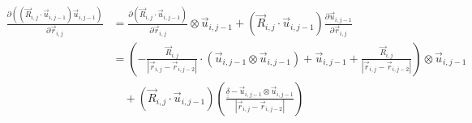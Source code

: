 \documentclass{article}
\renewcommand{\ij}{_{i,j}}
\newcommand{\ijj}{_{i,j-1}}
\newcommand{\ijk}{_{i,j-2}}
\newcommand{\ijjj}{_{i,j-2}}
\newcommand{\magn}[1]{\left\vert #1 \right\vert }
\renewcommand{\part}[2]{\frac{\partial #1 }{\partial #2}}
\newcommand{\ten}[1]{\underline{\underline{#1}}}
\newcommand{\rij}{\vec{r} \ij}
\newcommand{\Rij}{\vec{R} \ij}
\newcommand{\rijjj}{\vec{r} \ijjj}
\newcommand{\uijj}{\vec{u} \ijj}
\begin{document}
\begin{align*}
  \part{\left(\left(\vec{R}\ij \cdot \vec{u} \ijj \right) 
  \vec{u} \ijj \right)
  }{\vec{r}\ij} 
  &= 
  \part{\left(\vec{R}\ij \cdot \vec{u} \ijj \right)}{\vec{r}\ij}  
  \otimes
  \vec{u} \ijj  + 
  \left(\vec{R}\ij \cdot \vec{u} \ijj \right)
  \part{\vec{u} \ijj }{\vec{r}\ij}
   \\
  &= 
  \left(
  -\frac{\vec{R} \ij}{\magn{\rij - \rijjj}} \cdot (\uijj \otimes \uijj ) 
  +  \uijj
  +  \frac{\Rij}{\magn{\rij - \rijjj}}
  \right) \otimes \uijj
  \\
  &
   \quad 
  +  
  \left(\vec{R}\ij \cdot \vec{u} \ijj \right)
  \left(
  {
  \frac{\ten{\delta} - \uijj \otimes \uijj}{\magn{\rij - \rijjj}}
  }
  \right)
\end{align*}
\end{document}
